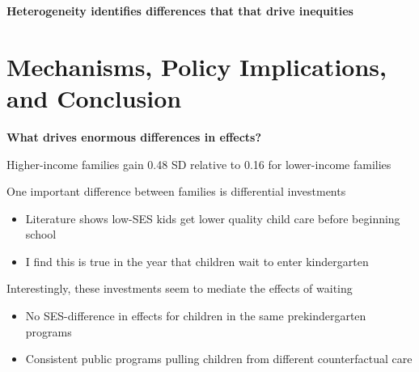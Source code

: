 \documentclass[t,aspectratio=169,11pt,presentation]{beamer}
\newenvironment{wideitemize}{\itemize\addtolength{\itemsep}{14pt}}{\enditemize}
\begin{document}
\begin{frame}[c]{\textbf{Heterogeneity identifies differences that that drive inequities}}
\centering



\end{frame}



\section{Mechanisms, Policy Implications, and Conclusion}


\begin{frame}{\textbf{What drives enormous differences in effects?}}
\begin{wideitemize}
    \item Higher-income families gain 0.48 SD relative to 0.16 for lower-income families
    
    \item<2-> One important difference between families is differential investments
    \begin{itemize}
        \item Literature shows low-SES kids get lower quality child care before beginning school
        
        {\tiny \color{gray} \citep{shapiro2019if,flood2021inequality}}
        
        \item I find this is true in the year that children wait to enter kindergarten
        
    \end{itemize}
    
    \item<3-> Interestingly, these investments seem to mediate the effects of waiting
        \begin{itemize}
        \item No SES-difference in effects for children in the same prekindergarten programs
            
        
        \hyperlink{ates}{}
    
            
        \item Consistent public programs pulling children from different counterfactual care
        
        {\tiny \color{gray} \citep{kline2016evaluating}}
        
        
    \end{itemize}
    
\end{wideitemize}


\end{frame}
\end{document}
